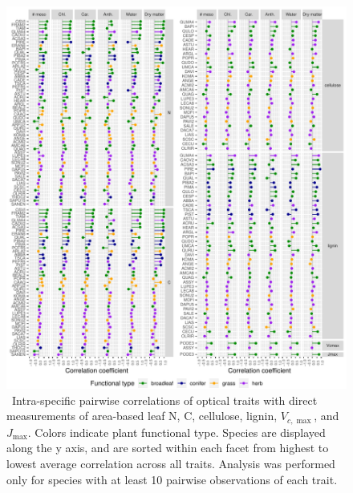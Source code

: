 \begin{figure}
  \centering
  \includegraphics[width=\textwidth]{3_prospect/figures/trait_correlations_lollipop.pdf}
  \caption{\
    Intra-specific pairwise correlations of optical traits with direct measurements of area-based
    leaf N, C, cellulose, lignin, $V_{c,\max}$, and $J_{\max}$.
    Colors indicate plant functional type.
    Species are displayed along the y axis, and are sorted within each facet from highest to lowest average correlation across all traits.
    Analysis was performed only for species with at least 10 pairwise observations of each trait.
  }\label{fig:trait_correlations}
\end{figure}

